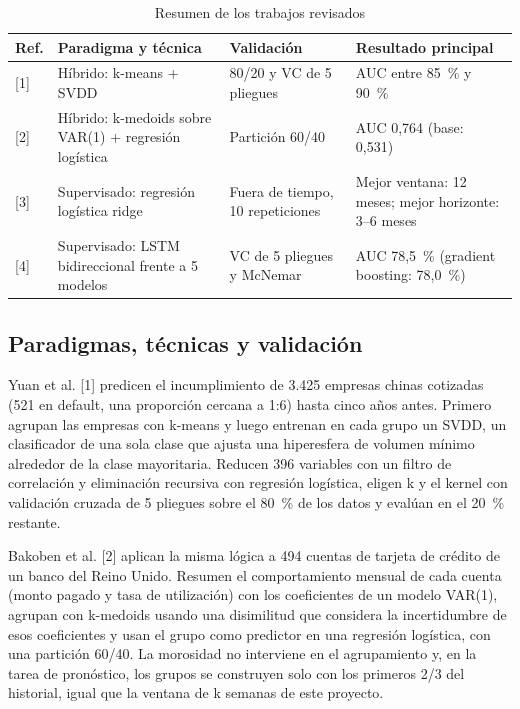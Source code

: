 \documentclass[journal]{IEEEtran}
\begin{document}
\begin{table}[H]
\caption{Resumen de los trabajos revisados}
\label{tab:estado}
\centering
\footnotesize
\begin{tabularx}{\columnwidth}{@{}p{}LLL@{}}
\toprule
Ref. & Paradigma y técnica & Validación & Resultado principal \\
\midrule
{[1]} & Híbrido: k-means + SVDD & 80/20 y VC de 5 pliegues & AUC entre 85~\% y 90~\% \\
{[2]} & Híbrido: k-medoids sobre VAR(1) + regresión logística & Partición 60/40 & AUC 0,764 (base: 0,531) \\
{[3]} & Supervisado: regresión logística ridge & Fuera de tiempo, 10 repeticiones & Mejor ventana: 12 meses; mejor horizonte: 3--6 meses \\
{[4]} & Supervisado: LSTM bidireccional frente a 5 modelos & VC de 5 pliegues y McNemar & AUC 78,5~\% (gradient boosting: 78,0~\%) \\
\bottomrule
\end{tabularx}
\end{table}

\subsection{Paradigmas, técnicas y validación}

Yuan et al. [1] predicen el incumplimiento de 3.425 empresas chinas cotizadas (521 en default, una proporción cercana a 1:6) hasta cinco años antes. Primero agrupan las empresas con k-means y luego entrenan en cada grupo un SVDD, un clasificador de una sola clase que ajusta una hiperesfera de volumen mínimo alrededor de la clase mayoritaria. Reducen 396 variables con un filtro de correlación y eliminación recursiva con regresión logística, eligen k y el kernel con validación cruzada de 5 pliegues sobre el 80~\% de los datos y evalúan en el 20~\% restante.

Bakoben et al. [2] aplican la misma lógica a 494 cuentas de tarjeta de crédito de un banco del Reino Unido. Resumen el comportamiento mensual de cada cuenta (monto pagado y tasa de utilización) con los coeficientes de un modelo VAR(1), agrupan con k-medoids usando una disimilitud que considera la incertidumbre de esos coeficientes y usan el grupo como predictor en una regresión logística, con una partición 60/40. La morosidad no interviene en el agrupamiento y, en la tarea de pronóstico, los grupos se construyen solo con los primeros 2/3 del historial, igual que la ventana de k semanas de este proyecto.
\end{document}
